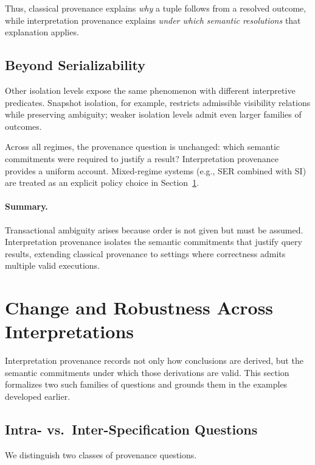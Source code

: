 \documentclass[acmsmall,nonacm]{acmart}
\theoremstyle{remark}
\numberwithin{definition}{section}
\numberwithin{theorem}{section}
\numberwithin{lemma}{section}
\numberwithin{corollary}{section}
\numberwithin{remark}{section}
\numberwithin{example}{section}
\numberwithin{observation}{section}
\numberwithin{assumption}{section}
\begin{document}
Thus, classical provenance explains \emph{why} a tuple follows from a resolved
outcome, while interpretation provenance explains \emph{under which semantic
resolutions} that explanation applies.

\subsection{Beyond Serializability}

Other isolation levels expose the same phenomenon with different interpretive
predicates.
Snapshot isolation, for example, restricts admissible visibility relations while
preserving ambiguity; weaker isolation levels admit even larger families of
outcomes.

Across all regimes, the provenance question is unchanged:
which semantic commitments were required to justify a result?
Interpretation provenance provides a uniform account.
Mixed-regime systems (e.g., SER combined with SI) are treated as an explicit
policy choice in Section~\ref{sec:robustness}.

\paragraph{Summary.}
Transactional ambiguity arises because order is not given but must be assumed.
Interpretation provenance isolates the semantic commitments that justify query
results, extending classical provenance to settings where correctness admits
multiple valid executions.

\section{Change and Robustness Across Interpretations}
\label{sec:robustness}

Interpretation provenance records not only how conclusions are derived, but the
semantic commitments under which those derivations are valid.
This section formalizes two such families of questions and grounds them in the
examples developed earlier.

\subsection{Intra- vs.\ Inter-Specification Questions}

We distinguish two classes of provenance questions.
\end{document}
